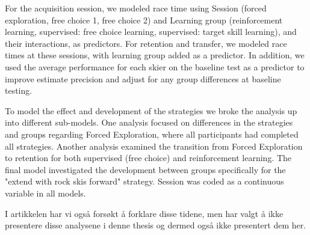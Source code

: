 For the acquisition session, we modeled race time using Session (forced exploration, free choice 1, free choice 2) and Learning group (reinforcement learning, supervised: free choice learning, supervised: target skill learning), and their interactions, as predictors. For retention and transfer, we modeled race times at these sessions, with learning group added as a predictor. In addition, we used the average performance for each skier on the baseline test as a predictor to improve estimate precision and adjust for any group differences at baseline testing. 

To model the effect and development of the strategies we broke the analysis up into different sub-models. One analysis focused on differences in the strategies and groups regarding Forced Exploration, where all participants had completed all strategies. Another analysis examined the transition from Forced Exploration to retention for both supervised (free choice) and reinforcement learning. The final model investigated the development between groups specifically for the "extend with rock skis forward" strategy. Session was coded as a continuous variable in all models. 

I artikkelen har vi også forsøkt å forklare disse tidene, men har valgt å ikke presentere disse analysene i denne thesis og dermed også ikke presentert dem her. 










